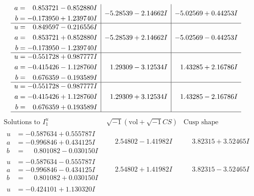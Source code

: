 \documentclass[1p]{elsarticle_modified}
\theoremstyle{definition}
\newcommand{\I}{\sqrt{-1}}
\begin{document}
$$\begin{array}{c|c|c}
\begin{aligned}
a &= \phantom{-}0.853721 - 0.852880 I \\
b &= -0.173950 + 1.239740 I\end{aligned}
 & -5.28539 - 2.14662 I & -5.02569 + 0.44253 I \\ \hline\begin{aligned}
u &= \phantom{-}0.849597 - 0.216556 I \\
a &= \phantom{-}0.853721 + 0.852880 I \\
b &= -0.173950 - 1.239740 I\end{aligned}
 & -5.28539 + 2.14662 I & -5.02569 - 0.44253 I \\ \hline\begin{aligned}
u &= -0.551728 + 0.987777 I \\
a &= -0.415426 - 1.128760 I \\
b &= \phantom{-}0.676359 - 0.193589 I\end{aligned}
 & \phantom{-}1.29309 - 3.12534 I & \phantom{-}1.43285 + 2.16786 I \\ \hline\begin{aligned}
u &= -0.551728 - 0.987777 I \\
a &= -0.415426 + 1.128760 I \\
b &= \phantom{-}0.676359 + 0.193589 I\end{aligned}
 & \phantom{-}1.29309 + 3.12534 I & \phantom{-}1.43285 - 2.16786 I\\
 \hline 
 \end{array}$$\newpage$$\begin{array}{c|c|c}  
\text{Solutions to }I^u_{1}& \I (\text{vol} + \sqrt{-1}CS) & \text{Cusp shape}\\
 \hline 
\begin{aligned}
u &= -0.587634 + 0.555787 I \\
a &= -0.996846 + 0.434125 I \\
b &= \phantom{-}0.801082 - 0.030150 I\end{aligned}
 & \phantom{-}2.54802 - 1.41982 I & \phantom{-}3.82315 + 3.52465 I \\ \hline\begin{aligned}
u &= -0.587634 - 0.555787 I \\
a &= -0.996846 - 0.434125 I \\
b &= \phantom{-}0.801082 + 0.030150 I\end{aligned}
 & \phantom{-}2.54802 + 1.41982 I & \phantom{-}3.82315 - 3.52465 I \\ \hline\begin{aligned}
u &= -0.424101 + 1.130320 I \\

\end{aligned}
\end{array}$$
\end{document}
